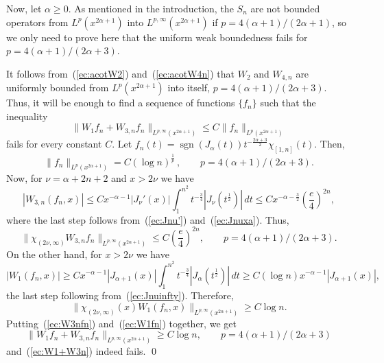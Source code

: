 \documentclass{amsart}
\theoremstyle{plain}
\newcommand{\sgn}{\operatorname{sgn}}
\begin{document}
Now, let $\alpha \geq 0$. As mentioned in the introduction, the $S_n$ are not
bounded operators from $L^p(x^{2\alpha+1})$ into $L^{p,\infty}(x^{2\alpha+1})$
if $p = 4(\alpha+1)/(2\alpha+1)$, so we only need to prove here that the
uniform weak boundedness fails for $p = 4(\alpha+1)/(2\alpha+3)$.

It follows from~(\ref{ec:acotW2}) and~(\ref{ec:acotW4n}) that $W_2$ and
$W_{4,n}$ are uniformly bounded from $L^p(x^{2\alpha+1})$ into itself, $p =
4(\alpha+1)/(2\alpha+3)$. Thus, it will be enough to find a sequence of
functions $\{f_n\}$ such that the inequality
\begin{equation}
\label{ec:W1+W3n}
   \| W_1 f_n + W_{3,n} f_n \|_{L^{p,\infty}(x^{2\alpha+1})}
   \leq C \| f_n \|_{L^p(x^{2\alpha+1})}
\end{equation}
fails for every constant $C$. Let
$
    f_n(t)
    = \sgn(J_{\alpha}(t))
    t^{-\frac{2\alpha+3}{2}}\chi_{[1,n]}(t)
$.
Then,
\begin{equation*}
   \| f_n \|_{L^p(x^{2\alpha+1})}
   = C (\log n)^\frac{1}{p}\, ,
   \qquad p = 4(\alpha+1)/(2\alpha+3).
\end{equation*}
Now, for $\nu = \alpha + 2n + 2$ and $x > 2 \nu$ we have 
\[
   |W_{3,n}(f_n,x)|
   \leq C x^{-\alpha-1} |J_\nu'(x)|
   \int_1^{n^2} t^{-\frac{3}{4}} |J_\nu(t^\frac{1}{2})| \, dt
   \leq C x^{-\alpha -\frac{3}{2}} \left(\frac{e}{4}\right)^{2n},
\]
where the last step follows from~(\ref{ec:Jnu'}) and~(\ref{ec:Jnuxa}). Thus,
\begin{equation}
\label{ec:W3nfn}
   \| \chi_{(2\nu,\infty)} W_{3,n} f_n
   \|_{L^{p,\infty}(x^{2\alpha+1})}
   \leq C \left(\frac{e}{4} \right)^{2n},
   \qquad p=4(\alpha+1)/(2\alpha+3).
\end{equation}
On the other hand, for $x > 2 \nu$ we have
\[
   |W_1(f_n,x)| 
   \geq C x^{-\alpha-1} |J_{\alpha+1}(x)|
   \int_1^{n^2} t^{-\frac{3}{4}}
   |J_\alpha(t^\frac{1}{2})| \, dt
   \geq C (\log n) x^{-\alpha-1}
   |J_{\alpha+1}(x)|,
\]
the last step following from~(\ref{ec:Jnuinfty}). Therefore,
\begin{equation}
\label{ec:W1fn}
   \| \chi_{(2\nu,\infty)}(x) W_1(f_n,x)
   \|_{L^{p,\infty}(x^{2\alpha+1})}
   \geq C \log n.
\end{equation}
Putting~(\ref{ec:W3nfn}) and~(\ref{ec:W1fn}) together, we get
\[
   \| W_1 f_n + W_{3,n} f_n
   \|_{L^{p,\infty}(x^{2\alpha+1})}
   \geq  C \log n,
   \qquad p = 4(\alpha+1)/(2\alpha+3)
\]
and~(\ref{ec:W1+W3n}) indeed fails. \qed

\end{document}
